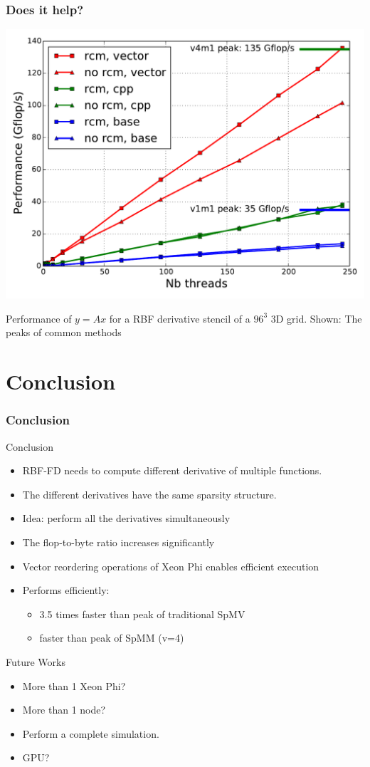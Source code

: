 \documentclass{beamer}
\begin{document}
\begin{frame}
  \frametitle{Does it help?}
  \begin{center}
    \includegraphics[width=.7\linewidth]{slides-figures/ICS-figures/mic_performance_nb_threads.pdf}
  \end{center}
  
  Performance of $y=Ax$ for a RBF derivative stencil of a $96^3$ 3D
  grid. Shown: The peaks of common methods
\end{frame}


\section{Conclusion}

\begin{frame}
  \frametitle{Conclusion}
  
  \begin{block}{Conclusion}
    \begin{itemize}
    \item RBF-FD needs to compute different derivative of multiple functions.
    \item The different derivatives have the same sparsity structure.
    \item Idea: perform all the derivatives simultaneously
    \item The flop-to-byte ratio increases significantly
    \item Vector reordering operations of Xeon Phi enables efficient execution
    \item Performs efficiently: 
      \begin{itemize}
      \item 3.5 times faster than peak of traditional SpMV  
      \item faster than peak of SpMM (v=4)
      \end{itemize}
    \end{itemize}
  \end{block}

  \begin{block}{Future Works}
    \begin{itemize}
    \item More than 1 Xeon Phi?
    \item More than 1 node?
    \item Perform a complete simulation.
    \item GPU?
    \end{itemize}
  \end{block}
\end{frame}
\end{document}
